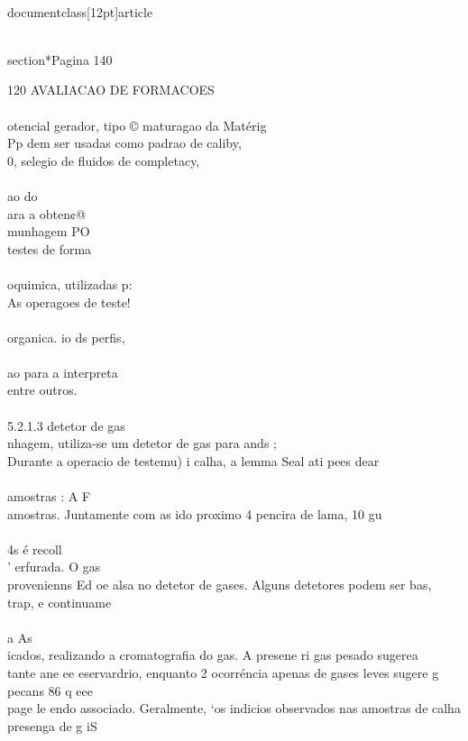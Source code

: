 \\documentclass[12pt]{article}
\begin{document}
\\section*{Pagina 140}

120 AVALIACAO DE FORMACOES\\
\\
otencial gerador, tipo © maturagao da Matérig\\
Pp dem ser usadas como padrao de caliby,\\
0, selegio de fluidos de completacy,\\
\\
ao do\\
ara a obten¢@\\
munhagem PO\\
testes de forma\\
\\
oquimica, utilizadas p:\\
As operagoes de teste!\\
\\
organica. io ds perfis,\\
\\
ao para a interpreta\\
entre outros.\\
\\
5.2.1.3 detetor de gas\\
nhagem, utiliza-se um detetor de gas para ands ;\\
Durante a operacio de testemu) i calha, a lemma Seal ati pees dear\\
\\
amostras : A F\\
amostras. Juntamente com as ido proximo 4 pencira de lama, 10 gu\\
\\
4s é recoll\\
' erfurada. O gas\\
provenienns Ed oe alsa no detetor de gases. Alguns detetores podem ser bas,\\
trap, e continuame\\
\\
a As\\
icados, realizando a cromatografia do gas. A presene ri gas pesado sugerea\\
tante ane ee eservardrio, enquanto 2 ocorréncia apenas de gases leves sugere g\\
pecans 86 q eee\\
page le endo associado. Geralmente, ‘os indicios observados nas amostras de calha\\
presenga de g iS\\
\\
\end{document}
